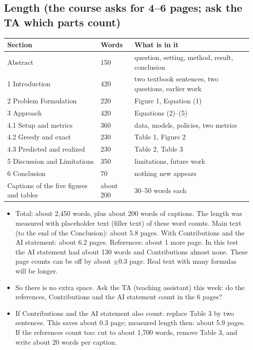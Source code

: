 \documentclass{article}
\newenvironment{pts}{\begin{itemize}[nosep,leftmargin=1.15em,topsep=1pt]}{\end{itemize}}
\begin{document}
\subsection*{Length (the course asks for 4--6 pages; ask the TA which parts count)}
\begin{center}\small\renewcommand{\arraystretch}{0.88}
\begin{tabular}{@{}lll@{}}
\toprule
Section & Words & What is in it\\
\midrule
Abstract & 150 & question, setting, method, result, conclusion\\
1 Introduction & 420 & two textbook sentences, two questions, earlier work\\
2 Problem Formulation & 220 & Figure 1, Equation (1)\\
3 Approach & 420 & Equations (2)--(5)\\
4.1 Setup and metrics & 360 & data, models, policies, two metrics\\
4.2 Greedy and exact & 230 & Table 1, Figure 2\\
4.3 Predicted and realized & 230 & Table 2, Table 3\\
5 Discussion and Limitations & 350 & limitations, future work\\
6 Conclusion & 70 & nothing new appears\\
Captions of the five figures and tables & about 200 & 30--50 words each\\
\bottomrule
\end{tabular}
\end{center}
\begin{pts}
\item Total: about 2{,}450 words, plus about 200 words of captions. The length was measured with placeholder text (filler text) of these word counts. Main text (to the end of the Conclusion): about 5.8 pages. With Contributions and the AI statement: about 6.2 pages. References: about 1 more page. In this test the AI statement had about 130 words and Contributions almost none. These page counts can be off by about $\pm 0.3$ page. Real text with many formulas will be longer.
\item So there is no extra space. Ask the TA (teaching assistant) this week: do the references, Contributions and the AI statement count in the 6 pages?
\item If Contributions and the AI statement also count: replace Table 3 by two sentences. This saves about 0.3 page; measured length then: about 5.9 pages. If the references count too: cut to about 1{,}700 words, remove Table 3, and write about 20 words per caption.
\end{pts}
\end{document}
